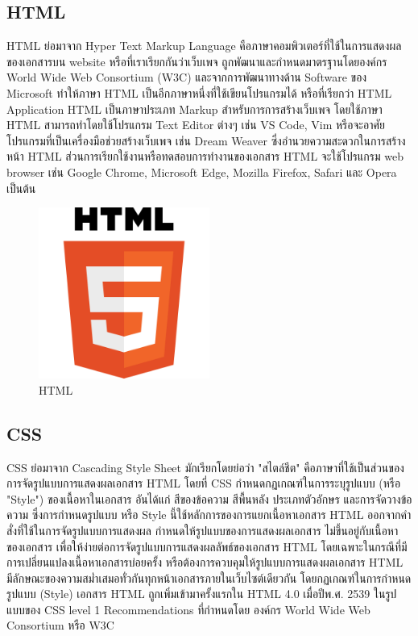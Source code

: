 \subsection{HTML}
HTML \cite{web:html} ย่อมาจาก Hyper Text Markup Language คือภาษาคอมพิวเตอร์ที่ใช้ในการแสดงผลของเอกสารบน website หรือที่เราเรียกกันว่าเว็บเพจ ถูกพัฒนาและกำหนดมาตรฐานโดยองค์กร World Wide Web Consortium (W3C) และจากการพัฒนาทางด้าน Software ของ Microsoft ทำให้ภาษา HTML เป็นอีกภาษาหนึ่งที่ใช้เขียนโปรแกรมได้ หรือที่เรียกว่า HTML Application
HTML เป็นภาษาประเภท Markup สำหรับการการสร้างเว็บเพจ โดยใช้ภาษา HTML สามารถทำโดยใช้โปรแกรม Text Editor ต่างๆ เช่น VS Code, Vim หรือจะอาศัยโปรแกรมที่เป็นเครื่องมือช่วยสร้างเว็บเพจ เช่น Dream Weaver ซึ่งอํานวยความสะดวกในการสร้างหน้า HTML ส่วนการเรียกใช้งานหรือทดสอบการทำงานของเอกสาร HTML จะใช้โปรแกรม web browser เช่น Google Chrome, Microsoft Edge, Mozilla Firefox, Safari และ Opera เป็นต้น
\begin{figure}
    \centering
    \includegraphics[width=0.5\textwidth]{img/html.png}
    \caption{HTML}
    \label{fig:html}
\end{figure}

\subsection{CSS}
CSS \cite{web:css} ย่อมาจาก Cascading Style Sheet  มักเรียกโดยย่อว่า "สไตล์ชีต" คือภาษาที่ใช้เป็นส่วนของการจัดรูปแบบการแสดงผลเอกสาร  HTML โดยที่ CSS กำหนดกฏเกณฑ์ในการระบุรูปแบบ (หรือ "Style") ของเนื้อหาในเอกสาร อันได้แก่ สีของข้อความ สีพื้นหลัง ประเภทตัวอักษร และการจัดวางข้อความ ซึ่งการกำหนดรูปแบบ หรือ Style นี้ใช้หลักการของการแยกเนื้อหาเอกสาร HTML ออกจากคำสั่งที่ใช้ในการจัดรูปแบบการแสดงผล กำหนดให้รูปแบบของการแสดงผลเอกสาร ไม่ขึ้นอยู่กับเนื้อหาของเอกสาร เพื่อให้ง่ายต่อการจัดรูปแบบการแสดงผลลัพธ์ของเอกสาร HTML โดยเฉพาะในกรณีที่มีการเปลี่ยนแปลงเนื้อหาเอกสารบ่อยครั้ง หรือต้องการควบคุมให้รูปแบบการแสดงผลเอกสาร HTML มีลักษณะของความสม่ำเสมอทั่วกันทุกหน้าเอกสารภายในเว็บไซต์เดียวกัน  โดยกฏเกณฑ์ในการกำหนดรูปแบบ (Style) เอกสาร HTML ถูกเพิ่มเข้ามาครั้งแรกใน HTML 4.0  เมื่อปีพ.ศ. 2539 ในรูปแบบของ CSS level 1 Recommendations ที่กำหนดโดย องค์กร World Wide Web Consortium หรือ W3C

